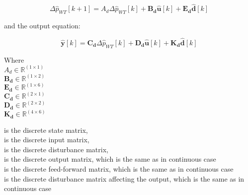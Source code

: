  \begin{equation}
\Delta \hat{p}_{WT} [k+1] = A_d \Delta \hat{p}_{WT}[k]  + \pmb{B_d} \pmb{\hat{u}}[k] + \pmb{E_d} \pmb{\hat{d}}[k] 
 \label{statespace_discrete_state}
\end{equation}

and the output equation:

\begin{equation}
  \pmb{\hat{y}}[k] = \pmb{C_d} \Delta \hat{p}_{WT}[k] + \pmb{D_d} \pmb{\hat{u}}[k] + \pmb{K_d} \pmb{\hat{d}}[k]
\label{statespace_control_output_discrete}
\end{equation}

\begin{minipage}[t]{0.20\textwidth}
Where\\
\hspace*{8mm} $A_d \in \mathbb{R}^{(1 \times 1)}$ \\
\hspace*{8mm} $\pmb{B_d} \in \pmb{\mathbb{R}}^{(1 \times 2)}$ \\
\hspace*{8mm} $\pmb{E_d} \in \pmb{\mathbb{R}}^{(1 \times 6)}$ \\
\hspace*{8mm} $\pmb{C_d} \in \pmb{\mathbb{R}}^{(2 \times 1)}$ \\
\newline
\hspace*{8mm} $\pmb{D_d} \in \pmb{\mathbb{R}}^{(2 \times 2)}$ \\
\newline
\hspace*{8mm} $\pmb{K_d} \in \pmb{\mathbb{R}}^{(4 \times 6)}$ 
\end{minipage}
\begin{minipage}[t]{0.68\textwidth}
\vspace*{2mm}
is the discrete state matrix, \\
is the discrete input matrix, \\
is the discrete disturbance matrix, \\ 
is the discrete output matrix, which is the same as in continuous case \\
is the discrete feed-forward matrix, which is the same as in continuous case \\
is the discrete disturbance matrix affecting the output, which is the same as in continuous case \\
\end{minipage}


